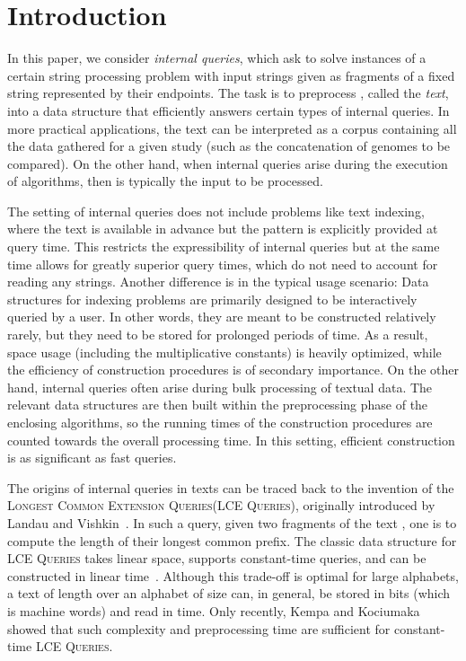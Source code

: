 \documentclass[a4paper]{article}
\theoremstyle{definition}
\theoremstyle{remark}
\newcommand{\LCEQFull}{\textsc{Longest Common Extension Queries}\xspace}
\newcommand{\LCEQ}{\textsc{LCE Queries}\xspace}
\begin{document}
\section{Introduction}
In this paper, we consider \emph{internal queries}, which ask to solve instances of a certain string processing problem with input strings given as fragments of a fixed string  represented by their endpoints. The task is to preprocess , called the \emph{text}, into a data structure that efficiently answers certain types of internal queries.
In more practical applications, the text  can be interpreted as a corpus containing all the data gathered for a given study
(such as the concatenation of genomes to be compared).
On the other hand, when internal queries arise during the execution of algorithms, then  is typically the input to be processed.

The setting of internal queries does not include problems like text indexing, where the text is available in advance but the pattern is explicitly provided at query time.
This restricts the expressibility of internal queries but at the same time allows for greatly superior query times, which do not need to account for reading any strings.
Another difference is in the typical usage scenario: Data structures for indexing problems are primarily designed to be interactively queried by a user.
In other words, they are meant to be constructed relatively rarely, but they need to be stored for prolonged periods of time.
As a result, space usage (including the multiplicative constants) is heavily optimized, while the efficiency of construction procedures is of secondary importance.
On the other hand, internal queries often arise during bulk processing of textual data.
The relevant data structures are then built within the preprocessing phase of the enclosing algorithms, 
so the running times of the construction procedures are counted towards the overall processing time. 
In this setting, efficient construction is as significant as fast queries. 

The origins of internal queries in texts can be traced back to the invention of the \LCEQFull (\LCEQ),
originally introduced by Landau and Vishkin~\cite{DBLP:journals/jcss/LandauV88}.
In such a query, given two fragments of the text , one is to compute the length of their longest common prefix.
The classic data structure for \LCEQ takes linear space, supports constant-time queries, and can be constructed in linear time~\cite{DBLP:journals/siamcomp/HarelT84,DBLP:journals/jcss/LandauV88,DBLP:journals/jacm/Farach-ColtonFM00}.
Although this trade-off is optimal for large alphabets, a text of length  over an alphabet of size  can, in general, be stored in  bits (which is  machine words) and read in  time.
Only recently, Kempa and Kociumaka~\cite{phd,Kempa2019} showed that such complexity and preprocessing time are sufficient for constant-time \LCEQ. 
\end{document}
